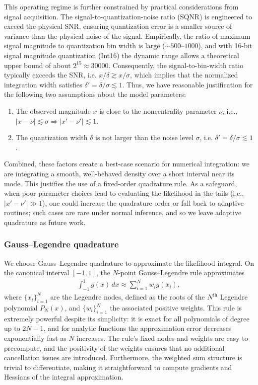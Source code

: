 \documentclass{article}
\begin{document}
This operating regime is further constrained by practical considerations from signal acquisition.
The signal-to-quantization-noise ratio (SQNR) is engineered to exceed the physical SNR, ensuring quantization error is a smaller source of variance than the physical noise of the signal.
Empirically, the ratio of maximum signal magnitude to quantization bin width is large ($\sim\!500\text{--}1000$), and with 16-bit signal magnitude quantization (Int16) the dynamic range allows a theoretical upper bound of about $2^{15} \approx 30000$.
Consequently, the signal-to-bin-width ratio typically exceeds the SNR, i.e. $x/\delta \gtrsim x/\sigma$, which implies that the normalized integration width satisfies $\delta' = \delta/\sigma \lesssim 1$.
Thus, we have reasonable justification for the following two assumptions about the model parameters:
%
\begin{enumerate}
  \item The observed magnitude $x$ is close to the noncentrality parameter $\nu$, i.e., $|x - \nu| \lesssim \sigma \Rightarrow |x' - \nu'| \lesssim 1$.
  \item The quantization width $\delta$ is not larger than the noise level $\sigma$, i.e. $\delta' = \delta / \sigma \lesssim 1$.
\end{enumerate}
%
Combined, these factors create a best-case scenario for numerical integration:
we are integrating a smooth, well-behaved density over a short interval near its mode.
This justifies the use of a fixed-order quadrature rule.
As a safeguard, when poor parameter choices lead to evaluating the likelihood in the tails (i.e., $|x'-\nu'| \gg 1$), one could increase the quadrature order or fall back to adaptive routines;
such cases are rare under normal inference, and so we leave adaptive quadrature as future work.

\subsubsection{Gauss--Legendre quadrature}

We choose Gauss--Legendre quadrature to approximate the likelihood integral.
On the canonical interval $[-1,1]$, the $N$-point Gauss--Legendre rule approximates
%
\begin{align}
  \int_{-1}^{1} g(x) \, dx \approx \sum_{i=1}^{N} w_i g(x_i),
\end{align}
%
where $\{x_i\}_{i=1}^N$ are the Legendre nodes, defined as the roots of the $N^\text{th}$ Legendre polynomial $P_N(x)$, and $\{w_i\}_{i=1}^N$ the associated positive weights.
This rule is extremely powerful despite its simplicity:
it is exact for all polynomials of degree up to $2N-1$, and for analytic functions the approximation error decreases exponentially fast as $N$ increases.
The rule's fixed nodes and weights are easy to precompute, and the positivity of the weights ensures that no additional cancellation issues are introduced.
Furthermore, the weighted sum structure is trivial to differentiate, making it straightforward to compute gradients and Hessians of the integral approximation.
\end{document}
